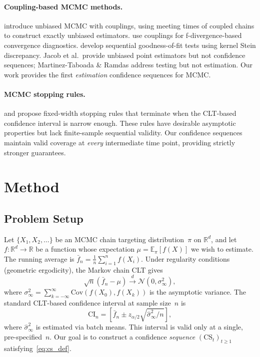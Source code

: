 \documentclass[11pt]{article}
\newcommand{\E}{\mathbb{E}}
\newcommand{\R}{\mathbb{R}}
\newcommand{\N}{\mathcal{N}}
\newcommand{\CS}{\mathrm{CS}}
\newcommand{\CI}{\mathrm{CI}}
\begin{document}
\paragraph{Coupling-based MCMC methods.}
\citet{jacob2020unbiased} introduce unbiased MCMC with couplings, using meeting times of coupled chains to construct exactly unbiased estimators. \citet{corenflos2025coupling} use couplings for f-divergence-based convergence diagnostics. \citet{martinez2025sequential} develop sequential goodness-of-fit tests using kernel Stein discrepancy. Jacob et al.\ provide unbiased point estimators but not confidence sequences; Martinez-Taboada \& Ramdas address testing but not estimation. Our work provides the first \emph{estimation} confidence sequences for MCMC.

\paragraph{MCMC stopping rules.}
\citet{robertson2021assessing} and \citet{vats2019multivariate} propose fixed-width stopping rules that terminate when the CLT-based confidence interval is narrow enough. These rules have desirable asymptotic properties but lack finite-sample sequential validity. Our confidence sequences maintain valid coverage at \emph{every} intermediate time point, providing strictly stronger guarantees.

\section{Method}
\label{sec:method}

\subsection{Problem Setup}

Let $\{X_1, X_2, \ldots\}$ be an MCMC chain targeting distribution~$\pi$ on $\R^d$, and let $f:\R^d \to \R$ be a function whose expectation $\mu = \E_\pi[f(X)]$ we wish to estimate. The running average is $\bar{f}_n = \frac{1}{n}\sum_{i=1}^n f(X_i)$. Under regularity conditions (geometric ergodicity), the Markov chain CLT gives
\begin{equation}
\sqrt{n}(\bar{f}_n - \mu) \xrightarrow{d} \N(0, \sigma^2_\infty),
\label{eq:mcmc_clt}
\end{equation}
where $\sigma^2_\infty = \sum_{k=-\infty}^{\infty} \mathrm{Cov}(f(X_0), f(X_k))$ is the asymptotic variance. The standard CLT-based confidence interval at sample size~$n$ is
\begin{equation}
\CI_n = \left[\bar{f}_n \pm z_{\alpha/2} \sqrt{\hat{\sigma}^2_\infty / n}\right],
\label{eq:clt_ci}
\end{equation}
where $\hat{\sigma}^2_\infty$ is estimated via batch means. This interval is valid only at a single, pre-specified~$n$. Our goal is to construct a confidence \emph{sequence} $(\CS_t)_{t \geq 1}$ satisfying~\eqref{eq:cs_def}.
\end{document}
